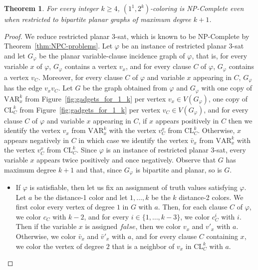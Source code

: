 \documentclass{article}
\newtheorem{theorem}{Theorem}
\newcommand{\colo}[2]{(1^{#1}, 2^{#2})}
\begin{document}
\begin{theorem}\label{thm:1_k_npc}
    For every integer $k \geq 4$, {\sc $\colo{1}{k}$-coloring} is NP-Complete even when restricted to bipartite planar graphs of maximum degree $k + 1$. 
\end{theorem}

\begin{proof}
    We reduce {\sc restricted planar $3$-sat}, which is known to be NP-Complete by Theorem~\ref{thm:NPC-problems}. Let $\varphi$ be an instance of {\sc restricted planar $3$-sat} and let $G_\varphi$ be the planar variable-clause incidence graph of $\varphi$, that is, for every variable $x$ of $\varphi$, $G_\varphi$ contains a vertex $v_x$, and for every clause $C$ of $\varphi$, $G_\varphi$ contains a vertex $v_C$. Moreover, for every clause $C$ of $\varphi$ and variable $x$ appearing in $C$, $G_\varphi$ has the edge $v_xv_C$. Let $G$ be the graph obtained from $\varphi$ and $G_\varphi$ with one copy of $\textrm{VAR}^k_{x}$ from Figure~\ref{fig:gadgets_for_1_k} per vertex $v_x \in V(G_\varphi)$, one copy of $\textrm{CL}^k_C$ from Figure~\ref{fig:gadgets_for_1_k} per vertex $v_C \in V(G_\varphi)$, and for every clause $C$ of $\varphi$ and variable $x$ appearing in $C$, if $x$ appears positively in $C$ then we identify the vertex $v_x$ from $\textrm{VAR}^k_{x}$ with the vertex $v_C^x$ from $\textrm{CL}^k_C$. Otherwise, $x$ appears negatively in $C$ in which case we identify the vertex $\bar{v}_x$ from $\textrm{VAR}^k_{x}$ with the vertex $v_C^x$ from $\textrm{CL}^k_C$. Since $\varphi$ is an instance of {\sc restricted planar $3$-sat}, every variable $x$ appears twice positively and once negatively. Observe that $G$ has maximum degree $k + 1$ and that, since $G_\varphi$ is bipartite and planar, so is $G$.
    \begin{itemize}
        \item If $\varphi$ is satisfiable, then  let us fix an assignment of truth values satisfying $\varphi$. Let $a$ be the distance-1 color and let $1, \dots, k$ be the $k$ distance-2 colors. We first color every vertex of degree $1$ in $G$ with $a$. Then, for each clause $C$ of $\varphi$, we color $c_C$ with $k - 2$, and for every $i \in \{1, \dots, k - 3\}$, we color $c^i_C$ with $i$. Then if the variable $x$ is assigned $false$, then we color $v_x$ and $v'_x$ with $a$. Otherwise, we color $\bar{v}_x$ and $\bar{v}'_x$ with $a$, and for every clause $C$ containing $x$, we color the vertex of degree $2$ that is a neighbor of $v_x$ in $\textrm{CL}_C^k$ with $a$. 

\end{itemize}
\end{proof}
\end{document}
